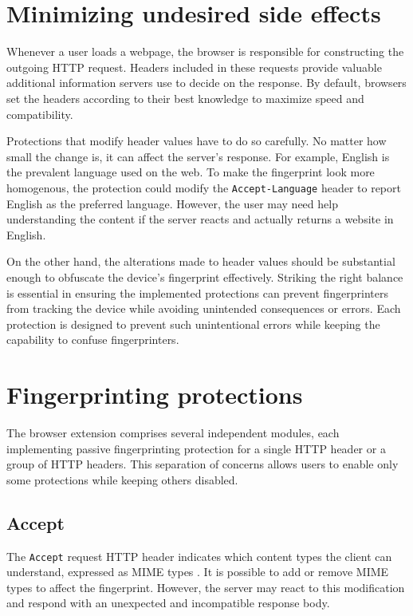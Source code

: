 \section{Minimizing undesired side effects}

Whenever a user loads a webpage, the browser is responsible for constructing the outgoing HTTP request. Headers included in these requests provide valuable additional information servers use to decide on the response. By default, browsers set the headers according to their best knowledge to maximize speed and compatibility.

Protections that modify header values have to do so carefully. No matter how small the change is, it can affect the server's response. For example, English is the prevalent language used on the web. To make the fingerprint look more homogenous, the protection could modify the \texttt{Accept-Language} header to report English as the preferred language. However, the user may need help understanding the content if the server reacts and actually returns a website in English.

On the other hand, the alterations made to header values should be substantial enough to obfuscate the device's fingerprint effectively. Striking the right balance is essential in ensuring the implemented protections can prevent fingerprinters from tracking the device while avoiding unintended consequences or errors. Each protection is designed to prevent such unintentional errors while keeping the capability to confuse fingerprinters.

\section{Fingerprinting protections}

The browser extension comprises several independent modules, each implementing passive fingerprinting protection for a single HTTP header or a group of HTTP headers. This separation of concerns allows users to enable only some protections while keeping others disabled.

\subsection{Accept}
\label{SectionHTTPHeaderAccept}

The \texttt{Accept} request HTTP header indicates which content types the client can understand, expressed as MIME types \cite{MDN}. It is possible to add or remove MIME types to affect the fingerprint. However, the server may react to this modification and respond with an unexpected and incompatible response body.

